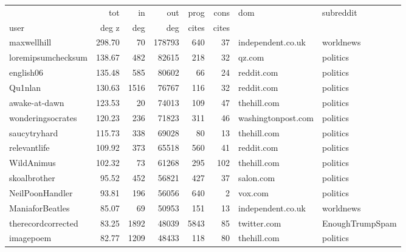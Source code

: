 \begin{tabular}{lrrrrrll}
\toprule
{} & tot & in & out &  prog &  cons & dom & subreddit \\
user & deg z & deg & deg & cites & cites &                       &                  \\
\midrule
maxwellhill         &     298.70 &      70 &   178793 &         640 &          37 &     independent.co.uk &        worldnews \\
loremipsumchecksum  &     138.67 &     482 &    82615 &         218 &          32 &                qz.com &         politics \\
english06           &     135.48 &     585 &    80602 &          66 &          24 &            reddit.com &         politics \\
Qu1nlan             &     130.63 &    1516 &    76767 &         116 &          32 &            reddit.com &         politics \\
awake-at-dawn       &     123.53 &      20 &    74013 &         109 &          47 &           thehill.com &         politics \\
wonderingsocrates   &     120.23 &     236 &    71823 &         311 &          46 &    washingtonpost.com &         politics \\
saucytryhard        &     115.73 &     338 &    69028 &          80 &          13 &           thehill.com &         politics \\
relevantlife        &     109.92 &     373 &    65518 &         560 &          41 &            reddit.com &         politics \\
WildAnimus          &     102.32 &      73 &    61268 &         295 &         102 &           thehill.com &         politics \\
skoalbrother        &      95.52 &     452 &    56821 &         427 &          37 &             salon.com &         politics \\
NeilPoonHandler     &      93.81 &     196 &    56056 &         640 &           2 &               vox.com &         politics \\
ManiaforBeatles     &      85.07 &      69 &    50953 &         151 &          13 &     independent.co.uk &        worldnews \\
therecordcorrected  &      83.25 &    1892 &    48039 &        5843 &          85 &           twitter.com &  EnoughTrumpSpam \\
imagepoem           &      82.77 &    1209 &    48433 &         118 &          80 &           thehill.com &         politics \\

\end{tabular}

